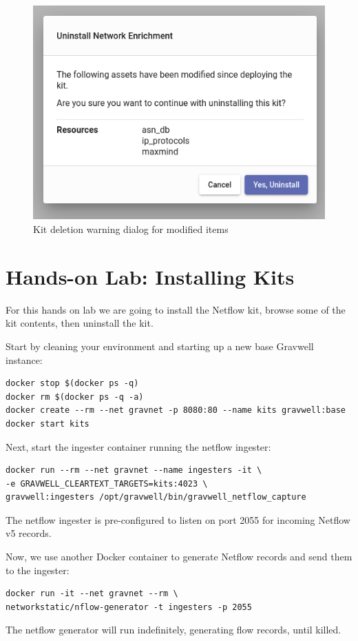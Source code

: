 \begin{figure}[H]
	\includegraphics[width=0.4\linewidth]{images/uninstall-warn.png}
	\caption{Kit deletion warning dialog for modified items}
	\label{fig:uninstall-warn}
\end{figure}

\section{Hands-on Lab: Installing Kits}

For this hands on lab we are going to install the Netflow kit, browse some of the kit contents, then uninstall the kit.

Start by cleaning your environment and starting up a new base Gravwell
instance:

\begin{Verbatim}[breaklines=true]
docker stop $(docker ps -q)
docker rm $(docker ps -q -a)
docker create --rm --net gravnet -p 8080:80 --name kits gravwell:base
docker start kits
\end{Verbatim}

Next, start the ingester container running the netflow ingester:

\begin{Verbatim}[breaklines=true]
docker run --rm --net gravnet --name ingesters -it \
-e GRAVWELL_CLEARTEXT_TARGETS=kits:4023 \
gravwell:ingesters /opt/gravwell/bin/gravwell_netflow_capture
\end{Verbatim}

The netflow ingester is pre-configured to listen on port 2055 for
incoming Netflow v5 records.

Now, we use another Docker container to generate Netflow records and
send them to the ingester:

\begin{Verbatim}[breaklines=true]
docker run -it --net gravnet --rm \
networkstatic/nflow-generator -t ingesters -p 2055
\end{Verbatim}

The netflow generator will run indefinitely, generating flow records,
until killed.

